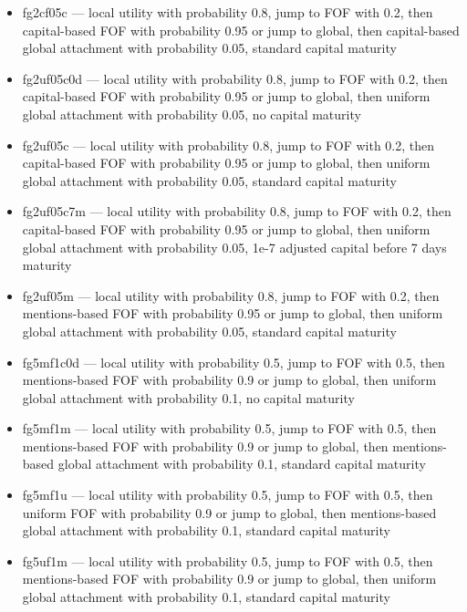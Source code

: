 \documentclass[10pt,oneside]{memoir}
\begin{document}
\begin{itemize}


\item fg2cf05c --- local utility with probability 0.8, jump to FOF with 0.2, then capital-based FOF with probability 0.95 or jump to global, then capital-based global attachment with probability 0.05, standard capital maturity

\item fg2uf05c0d --- local utility with probability 0.8, jump to FOF with 0.2, then capital-based FOF with probability 0.95 or jump to global, then uniform global attachment with probability 0.05, no capital maturity

\item fg2uf05c --- local utility with probability 0.8, jump to FOF with 0.2, then capital-based FOF with probability 0.95 or jump to global, then uniform global attachment with probability 0.05, standard capital maturity

\item fg2uf05c7m --- local utility with probability 0.8, jump to FOF with 0.2, then capital-based FOF with probability 0.95 or jump to global, then uniform global attachment with probability 0.05, 1e-7 adjusted capital before 7 days maturity

\item fg2uf05m --- local utility with probability 0.8, jump to FOF with 0.2, then mentions-based FOF with probability 0.95 or jump to global, then uniform global attachment with probability 0.05, standard capital maturity

\item fg5mf1c0d --- local utility with probability 0.5, jump to FOF with 0.5, then mentions-based FOF with probability 0.9 or jump to global, then uniform global attachment with probability 0.1, no capital maturity

\item fg5mf1m --- local utility with probability 0.5, jump to FOF with 0.5, then mentions-based FOF with probability 0.9 or jump to global, then mentions-based global attachment with probability 0.1, standard capital maturity

\item fg5mf1u --- local utility with probability 0.5, jump to FOF with 0.5, then uniform FOF with probability 0.9 or jump to global, then mentions-based global attachment with probability 0.1, standard capital maturity

\item fg5uf1m --- local utility with probability 0.5, jump to FOF with 0.5, then mentions-based FOF with probability 0.9 or jump to global, then uniform global attachment with probability 0.1, standard capital maturity


\end{itemize}
\end{document}
